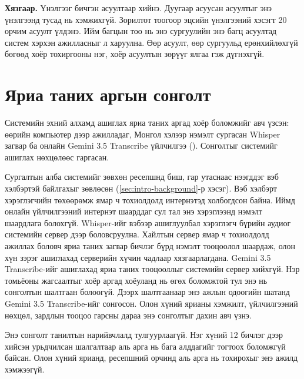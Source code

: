 \textbf{Хязгаар.} Үнэлгээг бичгэн асуултаар хийнэ. Дуугаар асуусан асуултыг энэ үнэлгээнд тусад нь хэмжихгүй. Зорилтот тоогоор эцсийн үнэлгээний хэсэгт 20 орчим асуулт үлдэнэ. Ийм багцын тоо нь энэ сургуулийн энэ багц асуултад систем хэрхэн ажилласныг л харуулна. Өөр асуулт, өөр сургуульд ерөнхийлөхгүй бөгөөд хоёр тохиргооны нэг, хоёр асуултын зөрүүг ялгаа гэж дүгнэхгүй.

\section{Яриа таних аргын сонголт}
\label{sec:stt-choice}

Системийн эхний алхамд ашиглах яриа таних аргад хоёр боломжийг авч үзсэн: өөрийн компьютер дээр ажилладаг, Монгол хэлээр нэмэлт сургасан Whisper загвар ба онлайн Gemini 3.5 Transcribe үйлчилгээ (). Сонголтыг системийг ашиглах нөхцөлөөс гаргасан.

Сургалтын алба системийг зөвхөн ресепшнд биш, гар утаснаас нээгддэг вэб хэлбэртэй байлгахыг зөвлөсөн (\ref{sec:intro-background}-р хэсэг). Вэб хэлбэрт хэрэглэгчийн төхөөрөмж ямар ч тохиолдолд интернэтэд холбогдсон байна. Иймд онлайн үйлчилгээний интернэт шаарддаг сул тал энэ хэрэглээнд нэмэлт шаардлага болохгүй. Whisper-ийг вэбээр ашиглуулбал хэрэглэгч бүрийн аудиог системийн сервер дээр боловсруулна. Хайлтын сервер ямар ч тохиолдолд ажиллах боловч яриа таних загвар бичлэг бүрд нэмэлт тооцоолол шаардаж, олон хүн зэрэг ашиглахад серверийн хүчин чадлаар хязгаарлагдана. Gemini 3.5 Transcribe-ийг ашиглахад яриа таних тооцооллыг системийн сервер хийхгүй. Нэр томьёоны жагсаалтыг хоёр аргад хоёуланд нь өгөх боломжтой тул энэ нь сонголтын шалтгаан болоогүй. Дээрх шалтгаанаар энэ ажлын одоогийн шатанд Gemini 3.5 Transcribe-ийг сонгосон. Олон хүний ярианы хэмжилт, үйлчилгээний нөхцөл, зардлын тооцоо гарсны дараа энэ сонголтыг дахин авч үзнэ.

Энэ сонголт танилтын нарийвчлалд тулгуурлаагүй. Нэг хүний 12 бичлэг дээр хийсэн урьдчилсан шалгалтаар аль арга нь бага алддагийг тогтоох боломжгүй байсан. Олон хүний ярианд, ресепшний орчинд аль арга нь тохирохыг энэ ажилд хэмжээгүй.

